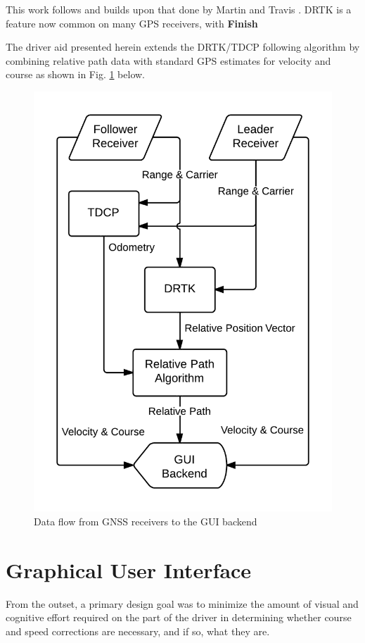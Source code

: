 \documentclass[twocolumn,10pt]{article}
\begin{document}
  This work follows and builds upon that done by Martin \cite{ScottThesis} and Travis \cite{travisdiss}.
  DRTK is a feature now common on many GPS receivers, with \textbf{Finish}
  
  The driver aid presented herein extends the DRTK/TDCP following algorithm by combining relative path data with standard GPS estimates for velocity and course as shown in Fig. \ref{fig:data_flow} below.

  \begin{figure}[ht] \centering
    \includegraphics[width=0.8\columnwidth]{../graphics/data_algo.png}
    \caption{Data flow from GNSS receivers to the GUI backend}
    \label{fig:data_flow}
  \end{figure}



\section*{Graphical User Interface}

  From the outset, a primary design goal was to minimize the amount of visual and cognitive effort required on the part of the driver in determining whether course and speed corrections are necessary, and if so, what they are.
\end{document}
